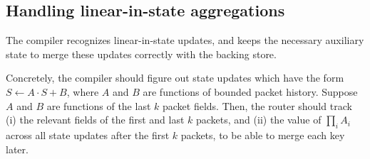 \subsection{Handling linear-in-state aggregations}
\label{sec:linear-in-state-compilation}

The \TheSystem compiler recognizes linear-in-state updates, and keeps
the necessary auxiliary state to merge these updates correctly with the backing
store. 

Concretely, the compiler should figure out state updates which have the form $S
\gets A \cdot S + B$, where $A$ and $B$ are functions of bounded packet
history. Suppose $A$ and $B$ are functions of the last $k$ packet fields. Then,
the router should track (i) the relevant fields of the first and last $k$
packets, and (ii) the value of $\prod_{i} A_i$ across all state updates after
the first $k$ packets, to be able to merge each key later. %




